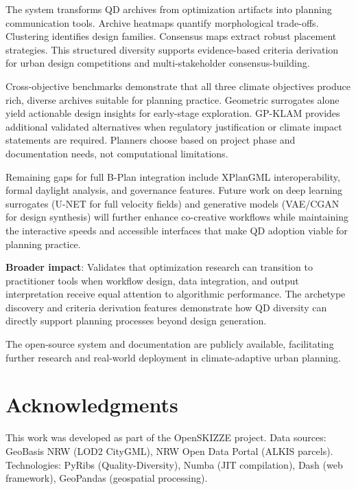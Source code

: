 \documentclass[times,final]{elsarticle}
\begin{document}
The system transforms QD archives from optimization artifacts into planning communication tools. Archive heatmaps quantify morphological trade-offs. Clustering identifies design families. Consensus maps extract robust placement strategies. This structured diversity supports evidence-based criteria derivation for urban design competitions and multi-stakeholder consensus-building.

Cross-objective benchmarks demonstrate that all three climate objectives produce rich, diverse archives suitable for planning practice. Geometric surrogates alone yield actionable design insights for early-stage exploration. GP-KLAM provides additional validated alternatives when regulatory justification or climate impact statements are required. Planners choose based on project phase and documentation needs, not computational limitations.

Remaining gaps for full B-Plan integration include XPlanGML interoperability, formal daylight analysis, and governance features. Future work on deep learning surrogates (U-NET for full velocity fields) and generative models (VAE/CGAN for design synthesis) will further enhance co-creative workflows while maintaining the interactive speeds and accessible interfaces that make QD adoption viable for planning practice.

\textbf{Broader impact}: Validates that optimization research can transition to practitioner tools when workflow design, data integration, and output interpretation receive equal attention to algorithmic performance. The archetype discovery and criteria derivation features demonstrate how QD diversity can directly support planning processes beyond design generation.

The open-source system and documentation are publicly available, facilitating further research and real-world deployment in climate-adaptive urban planning.

\section*{Acknowledgments}
This work was developed as part of the OpenSKIZZE project. Data sources: GeoBasis NRW (LOD2 CityGML), NRW Open Data Portal (ALKIS parcels). Technologies: PyRibs (Quality-Diversity), Numba (JIT compilation), Dash (web framework), GeoPandas (geospatial processing).



\end{document}

